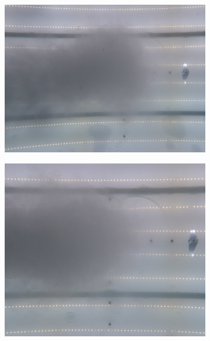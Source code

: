 \begin{figure}[ht!]
\centering
\begin{subfigure}{.3\textwidth}
  \centering
  \includegraphics[width=.9\linewidth]{Images/Snapshot_Topview_Rond.png}
\end{subfigure}
\begin{subfigure}{.26\textwidth}
  \centering
  \includegraphics[width=.9\linewidth]{Images/Snapshot_Rechthoek_20x39.png}
\end{subfigure}
\begin{subfigure}{.24\textwidth}
  \centering

\end{subfigure}
\end{figure}
